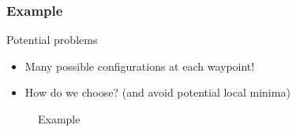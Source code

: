 \documentclass[10pt]{beamer}
\begin{document}
\begin{frame}
\frametitle{Example}

\begin{center}
	\begin{normalsize}
	{\color{blue} Potential problems}
	\end{normalsize}

	\begin{itemize}
		\item{ Many possible configurations at each waypoint! }
		\item{ How do we choose? (and avoid potential local minima) }
	\end{itemize}
\end{center}

\begin{figure}[]
		\centering
          \caption{Example}
          \label{fig:IntroSteps}
\end{figure}


\end{frame}
\end{document}
